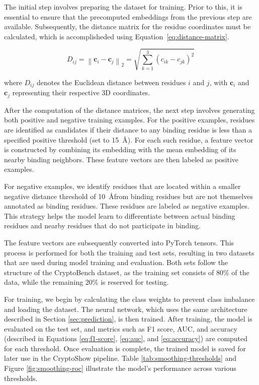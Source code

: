 The initial step involves preparing the dataset for training. Prior to this, it is essential to ensure that the precomputed embeddings from the previous step are available. Subsequently, the distance matrix for the residue coordinates must be calculated, which is accomplisheded using Equation~\ref{eq:distance-matrix}.

\begin{equation}
D_{ij} = \left\| \mathbf{c}_i - \mathbf{c}_j \right\|_2 = \sqrt{ \sum_{k=1}^3 (c_{ik} - c_{jk})^2 }
\label{eq:distance-matrix}
\end{equation}

where $D_{ij}$ denotes the Euclidean distance between residues $i$ and $j$, with $\mathbf{c}_i$ and $\mathbf{c}_j$ representing their respective 3D coordinates.

After the computation of the distance matrices, the next step involves generating both positive and negative training examples. For the positive examples, residues are identified as candidates if their distance to any binding residue is less than a specified positive threshold (set to 15~\AA). For each such residue, a feature vector is constructed by combining its embedding with the mean embedding of its nearby binding neighbors. These feature vectors are then labeled as positive examples.

For negative examples, we identify residues that are located within a smaller negative distance threshold of 10~\AA from binding residues but are not themselves annotated as binding residues. These residues are labeled as negative examples. This strategy helps the model learn to differentiate between actual binding residues and nearby residues that do not participate in binding.

The feature vectors are subsequently converted into PyTorch \cite{imambi2021pytorch} tensors. This process is performed for both the training and test sets, resulting in two datasets that are used during model training and evaluation. Both sets follow the structure of the CryptoBench dataset, as the training set consists of 80\% of the data, while the remaining 20\% is reserved for testing.

For training, we begin by calculating the class weights to prevent class imbalance and loading the dataset. The neural network, which uses the same architecture described in Section \ref{sec:prediction}, is then trained. After training, the model is evaluated on the test set, and metrics such as F1 score, AUC, and accuracy (described in Equations \ref{eq:f1-score}, \ref{eq:auc}, and \ref{eq:accuracy}) are computed for each threshold. Once evaluation is complete, the trained model is saved for later use in the CryptoShow pipeline. Table \ref{tab:smoothing-thresholds} and Figure \ref{fig:smoothing-roc} illustrate the model's performance across various thresholds.


